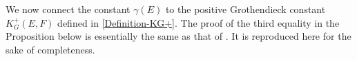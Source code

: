 \documentclass[a4paper,oneside,11pt, reqno]{amsart}
\numberwithin{equation}{section}
\theoremstyle{plain}
\begin{document}
We now connect the constant $\gamma(E)$ to the positive Grothendieck constant $K_G^+(E,F)$ defined in \eqref{Definition-KG+}. The proof of the third equality in the Proposition below is essentially the same as that of \cite[Fact 2]{BM}. It is reproduced here for the sake of completeness.


\end{document}
